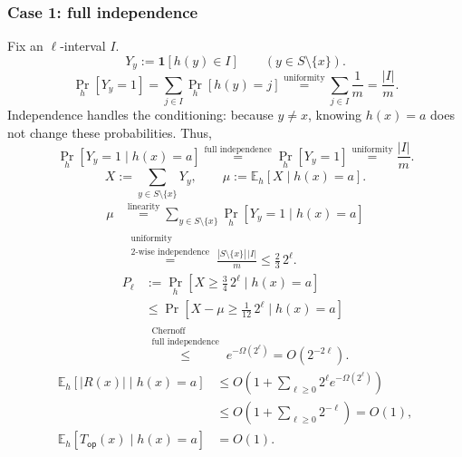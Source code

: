 \documentclass[12pt,a4paper]{article}
\begin{document}
\subsubsection*{Case 1: full independence}
Fix an $\ell$-interval $I$.
\[
Y_y:=\mathbf1[h(y)\in I]\qquad(y\in S\setminus\{x\}).
\]
\[
\Pr_h[Y_y=1]
=\sum_{j\in I}\Pr_h[h(y)=j]
\overset{\text{uniformity}}{=}\sum_{j\in I}\frac1m
=\frac{|I|}{m}.
\]
Independence handles the conditioning: because $y\neq x$, knowing $h(x)=a$
does not change these probabilities. Thus,
\[
\Pr_h[Y_y=1\mid h(x)=a]
\overset{\text{full independence}}{=}\Pr_h[Y_y=1]
\overset{\text{uniformity}}{=}\frac{|I|}{m}.
\]
\[
X:=\sum_{y\in S\setminus\{x\}}Y_y,\qquad
\mu:=\mathbb E_h[X\mid h(x)=a].
\]
\[
\begin{aligned}
\mu
&\overset{\text{linearity}}{=}\sum_{y\in S\setminus\{x\}}
 \Pr_h[Y_y=1\mid h(x)=a]\\
&\overset{\substack{\text{uniformity}\\\text{2-wise independence}}}{=}
 \frac{|S\setminus\{x\}|\,|I|}{m}
\leq\frac23\,2^\ell.
\end{aligned}
\]
\[
\begin{aligned}
P_\ell&:=\Pr_h[X\geq\tfrac34\,2^\ell\mid h(x)=a]\\
&\leq\Pr\!\left[X-\mu\geq\frac1{12}\,2^\ell\mid h(x)=a\right]\\
&\overset{\substack{\text{Chernoff}\\\text{full independence}}}{\leq}
e^{-\Omega(2^\ell)}
=O(2^{-2\ell}).
\end{aligned}
\]
\[
\begin{aligned}
\mathbb E_h[|R(x)|\mid h(x)=a]
&\leq O\!\left(1+\sum_{\ell\geq0}2^\ell e^{-\Omega(2^\ell)}\right)\\
&\leq O\!\left(1+\sum_{\ell\geq0}2^{-\ell}\right)
=O(1),\\
\mathbb E_h[T_{\mathsf{op}}(x)\mid h(x)=a]&=O(1).
\end{aligned}
\]

\clearpage
\end{document}

